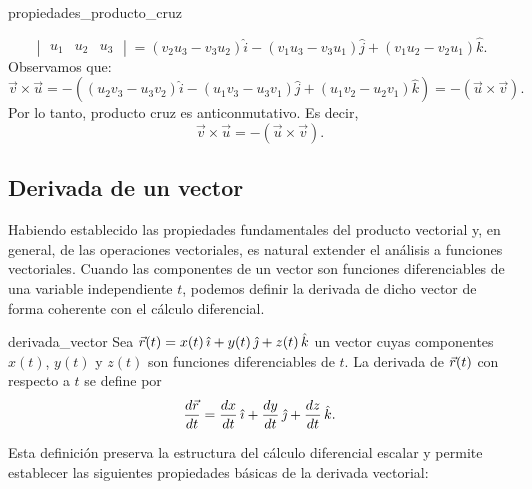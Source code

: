 \begin{theorem}{}{propiedades_producto_cruz}
\begin{enumerate}[label=\textit{\roman*)}]
$$\begin{vmatrix}
            u_1 & u_2 & u_3
        \end{vmatrix}
        = (v_2u_3 - v_3u_2)\hat{i} - (v_1u_3 - v_3u_1)\hat{j} + (v_1u_2 - v_2u_1)\hat{k}.$$
        Observamos que:
        $$\vec{v} \times \vec{u} = -\left( (u_2v_3 - u_3v_2)\hat{i} - (u_1v_3 - u_3v_1)\hat{j} + (u_1v_2 - u_2v_1)\hat{k} \right) = -(\vec{u} \times \vec{v}).$$
        Por lo tanto, producto cruz es anticonmutativo. Es decir,
        \begin{equation*}
            \vec{v} \times \vec{u} = -(\vec{u} \times \vec{v}). \tag*{\BlackSquare}
        \end{equation*}
    \end{enumerate}
\end{theorem}

\subsection{Derivada de un vector}

Habiendo establecido las propiedades fundamentales del producto vectorial y, en general, de las operaciones vectoriales, es natural extender el análisis a funciones vectoriales. Cuando las componentes de un vector son funciones diferenciables de una variable independiente $t$, podemos definir la derivada de dicho vector de forma coherente con el cálculo diferencial.

\begin{definition}{}{derivada_vector}
    Sea $\vec{r}(t) = x(t)\,\hat{\imath} + y(t)\,\hat{\jmath} + z(t)\,\hat{k}$ un vector cuyas componentes $x(t)$, $y(t)$ y $z(t)$ son funciones diferenciables de $t$. La derivada de $\vec{r}(t)$ con respecto a $t$ se define por
    $$\frac{d\vec{r}}{dt} = \frac{dx}{dt}\,\hat{\imath} + \frac{dy}{dt}\,\hat{\jmath} + \frac{dz}{dt}\,\hat{k}.$$
\end{definition}

Esta definición preserva la estructura del cálculo diferencial escalar y permite establecer las siguientes propiedades básicas de la derivada vectorial:

